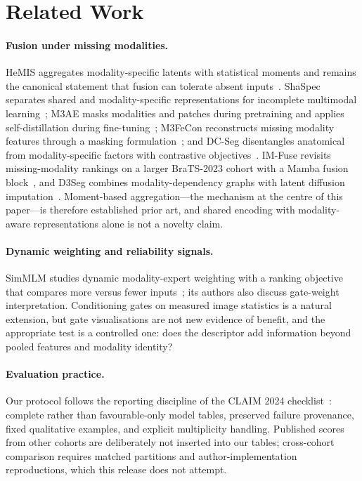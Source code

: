 \section{Related Work}
\label{sec:related} \paragraph{Fusion under missing modalities.}
HeMIS aggregates modality-specific latents with statistical moments and remains the canonical statement that fusion can tolerate absent inputs~\cite{havaei2016hemis}. ShaSpec separates shared and modality-specific representations for incomplete multimodal learning~\cite{wang2023shaspec}; M3AE masks modalities and patches during pretraining and applies self-distillation during fine-tuning~\cite{liu2023m3ae}; M3FeCon reconstructs missing modality features through a masking formulation~\cite{zeng2024missing}; and DC-Seg disentangles anatomical from modality-specific factors with contrastive objectives~\cite{li2025dcseg}. IM-Fuse revisits missing-modality rankings on a larger BraTS-2023 cohort with a Mamba fusion block~\cite{pipoli2025imfuse}, and D3Seg combines modality-dependency graphs with latent diffusion imputation~\cite{ali2026d3seg}. Moment-based aggregation---the mechanism at the centre of this paper---is therefore established prior art, and shared encoding with modality-aware representations alone is not a novelty claim. \paragraph{Dynamic weighting and reliability signals.}
SimMLM studies dynamic modality-expert weighting with a ranking objective that compares more versus fewer inputs~\cite{li2025simmlm}; its authors also discuss gate-weight interpretation. Conditioning gates on measured image statistics is a natural extension, but gate visualisations are not new evidence of benefit, and the appropriate test is a controlled one: does the descriptor add information beyond pooled features and modality identity? \paragraph{Evaluation practice.}
Our protocol follows the reporting discipline of the CLAIM 2024 checklist~\cite{tejani2024claim}: complete rather than favourable-only model tables, preserved failure provenance, fixed qualitative examples, and explicit multiplicity handling. Published scores from other cohorts are deliberately not inserted into our tables; cross-cohort comparison requires matched partitions and author-implementation reproductions, which this release does not attempt.
